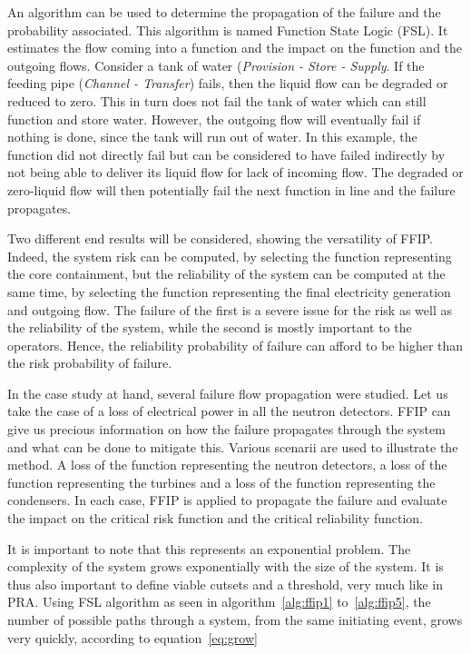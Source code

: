 An algorithm can be used to determine the propagation of the failure and the probability associated. This algorithm is named Function State Logic (FSL). It estimates the flow coming into a function and the impact on the function and the outgoing flows. Consider a tank of water (\textit{Provision - Store - Supply}. If the feeding pipe (\textit{Channel - Transfer}) fails, then the liquid flow can be degraded or reduced to zero. This in turn does not fail the tank of water which can still function and store water. However, the outgoing flow will eventually fail if nothing is done, since the tank will run out of water. In this example, the function did not directly fail but can be considered to have failed indirectly by not being able to deliver its liquid flow for lack of incoming flow. The degraded or zero-liquid flow will then potentially fail the next function in line and the failure propagates.

Two different end results will be considered, showing the versatility of FFIP. Indeed, the system risk can be computed, by selecting the function representing the core containment, but the reliability of the system can be computed at the same time, by selecting the function representing the final electricity generation and outgoing flow. The failure of the first is a severe issue for the risk as well as the reliability of the system, while the second is mostly important to the operators. Hence, the reliability probability of failure can afford to be higher than the risk probability of failure.

In the case study at hand, several failure flow propagation were studied. Let us take the case of a loss of electrical power in all the neutron detectors. FFIP can give us precious information on how the failure propagates through the system and what can be done to mitigate this. Various scenarii are used to illustrate the method. A loss of the function representing the neutron detectors, a loss of the function representing the turbines and a loss of the function representing the condensers. In each case, FFIP is applied to propagate the failure and evaluate the impact on the critical risk function and the critical reliability function.

It is important to note that this represents an exponential problem. The complexity of the system grows exponentially with the size of the system. It is thus also important to define viable cutsets and a threshold, very much like in PRA. Using FSL algorithm as seen in algorithm~\ref{alg:ffip1} to~\ref{alg:ffip5}, the number of possible paths through a system, from the same initiating event, grows very quickly, according to equation~\ref{eq:grow}

